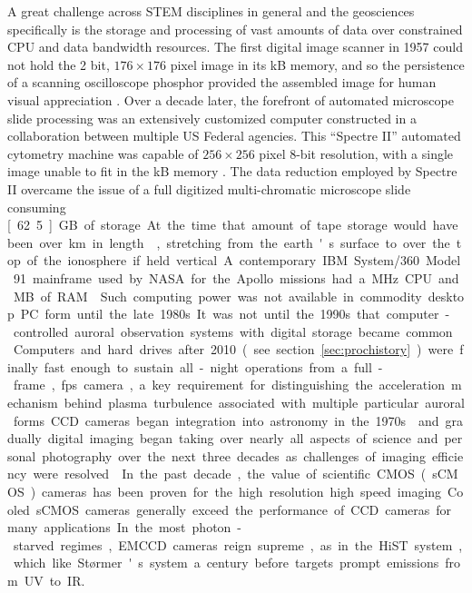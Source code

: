 A great challenge across STEM disciplines in general and the geosciences specifically is the storage and processing of vast amounts of data over constrained CPU and data bandwidth resources.
The first digital image scanner in 1957 could not hold the 2 bit, $176 \times 176$ pixel image in its \unit[6]{kB} memory, and so the persistence of a scanning oscilloscope phosphor provided the assembled image for human visual appreciation \citep{kirsch1958}.
Over a decade later, the forefront of automated microscope slide processing was an extensively customized computer constructed in a collaboration between multiple US Federal agencies.
This ``Spectre II'' automated cytometry machine was capable of $256 \times 256$ pixel 8-bit resolution, with a single image unable to fit in the \unit[16]{kB} memory \citep{shapiro1969}.
The data reduction employed by Spectre II overcame the issue of a full digitized multi-chromatic microscope slide consuming \unit[62.5]{GB} of storage.
At the time that amount of tape storage would have been over \unit[1200]{km} in length \citep{shapiro1969}, stretching from the earth's surface to over the top of the ionosphere if held vertical.
A contemporary IBM System/360 Model 91 mainframe used by NASA for the Apollo missions had a \unit[16]{MHz} CPU and \unit[2]{MB} of RAM \citep{ibm1967}.
Such computing power was not available in commodity desktop PC form until the late 1980s.
It was not until the 1990s that computer-controlled auroral observation systems with digital storage became common \citep{bjornthesis}.
Computers and hard drives after 2010 (see section~\ref{sec:prochistory}) were finally fast enough to sustain all-night operations from a full-frame, \unit[50]{fps} camera, a key requirement for distinguishing the acceleration mechanism behind plasma turbulence associated with multiple particular auroral forms.

CCD cameras began integration into astronomy in the 1970s \citep{lynds1975} and gradually digital imaging began taking over nearly all aspects of science and personal photography over the next three decades as challenges of imaging efficiency were resolved \citep{monet1993}.
In the past decade, the value of scientific CMOS (sCMOS) cameras has been proven for the high resolution high speed imaging. 
Cooled sCMOS cameras generally exceed the performance of CCD cameras for many applications.
In the most photon-starved regimes, EMCCD cameras reign supreme, as in the HiST system, which like Størmer's system a century before targets prompt emissions from UV to IR.
